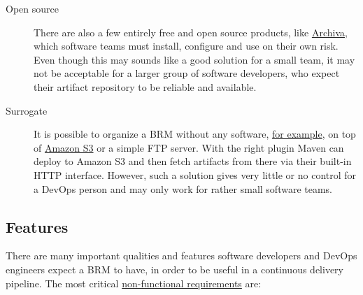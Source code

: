 \documentclass[12pt,oneside]{article}
\begin{document}
\begin{description}
  \item[Open source]
  There are also a few entirely free and open source products, like
  \href{https://archiva.apache.org/index.cgi}{Archiva}, which software
  teams must install, configure and use on their own risk. Even though
  this may sounds like a good solution for a small team, it may not be
  acceptable for a larger group of software developers, who expect their
  artifact repository to be reliable and available.

  \item[Surrogate]
  It is possible to organize a BRM without any software,
  \href{https://www.yegor256.com/2015/09/07/maven-repository-amazon-s3.html}{for example},
  on top of \href{https://aws.amazon.com/s3/}{Amazon S3}
  or a simple FTP server. With the right plugin
  Maven can deploy to Amazon S3 and then fetch artifacts from there
  via their built-in HTTP interface. However, such a solution gives
  very little or no control for a DevOps person and may only
  work for rather small software teams.
\end{description}

\subsection{Features}
\label{sec:features}

There are many important qualities and features software developers and DevOps
engineers expect a BRM to have, in order to be useful in a continuous
delivery pipeline. The most critical
\href{https://en.wikipedia.org/wiki/Non-functional_requirement}{non-functional requirements}
are:
\end{document}

